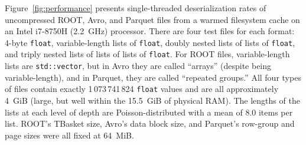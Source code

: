 \documentclass{webofc}
\begin{document}
Figure~\ref{fig:performance} presents single-threaded deserialization rates of uncompressed ROOT, Avro, and Parquet files from a warmed filesystem cache on an Intel i7-8750H (2.2~GHz) processor. There are four test files for each format: 4-byte \texttt{float}, variable-length lists of \texttt{float}, doubly nested lists of lists of \texttt{float}, and triply nested lists of lists of lists of \texttt{float}. For ROOT files, variable-length lists are \texttt{std::vector}, but in Avro they are called ``arrays'' (despite being variable-length), and in Parquet, they are called ``repeated groups.'' All four types of files contain exactly 1\,073\,741\,824 \texttt{float} values and are all approximately 4~GiB (large, but well within the 15.5~GiB of physical RAM). The lengths of the lists at each level of depth are Poisson-distributed with a mean of 8.0 items per list. ROOT's TBasket size, Avro's data block size, and Parquet's row-group and page sizes were all fixed at 64~MiB.
\end{document}
